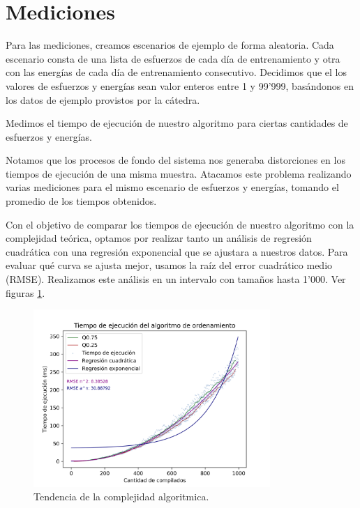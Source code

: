\section{Mediciones}


Para las mediciones, creamos escenarios de ejemplo de forma aleatoria. Cada escenario consta de
una lista de esfuerzos de cada día de entrenamiento y otra con las energías de cada día de
entrenamiento consecutivo. Decidimos que el los valores de esfuerzos y energías sean valor enteros
entre 1 y 99'999, basándonos en los datos de ejemplo provistos por la cátedra.

Medimos el tiempo de ejecución de nuestro algoritmo para ciertas cantidades de esfuerzos y energías.

Notamos que los procesos de fondo del sistema nos generaba distorciones en los tiempos de ejecución
de una misma muestra. Atacamos este problema realizando varias mediciones para el mismo escenario de
esfuerzos y energías, tomando el promedio de los tiempos obtenidos.

Con el objetivo de comparar los tiempos de ejecución de nuestro algoritmo con la complejidad teórica, optamos por 
realizar tanto un análisis de regresión cuadrática con una regresión exponencial que se ajustara a nuestros datos.
Para evaluar qué curva se ajusta mejor, usamos la raíz del error cuadrático medio (RMSE). Realizamos este análisis en un
intervalo con tamaños hasta 1'000. Ver figuras \ref{fig:tiempos_puntos}.

\begin{figure}[H]
    \centering
    \includegraphics[width=0.8\textwidth]{img/tiempos_puntos.png}
    \caption{Tendencia de la complejidad algoritmica.}
    \label{fig:tiempos_puntos}
\end{figure}

